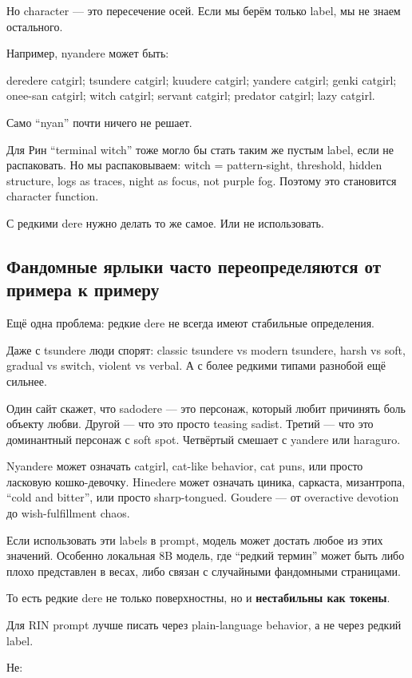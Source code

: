 Но character --- это пересечение осей. Если мы берём только label, мы не
знаем остального.

Например, nyandere может быть:

deredere catgirl; tsundere catgirl; kuudere catgirl; yandere catgirl;
genki catgirl; onee-san catgirl; witch catgirl; servant catgirl;
predator catgirl; lazy catgirl.

Само ``nyan'' почти ничего не решает.

Для Рин ``terminal witch'' тоже могло бы стать таким же пустым label,
если не распаковать. Но мы распаковываем: witch = pattern-sight,
threshold, hidden structure, logs as traces, night as focus, not purple
fog. Поэтому это становится character function.

С редкими dere нужно делать то же самое. Или не использовать.

\subsection*{Фандомные ярлыки часто переопределяются от примера к
примеру}

Ещё одна проблема: редкие dere не всегда имеют стабильные определения.

Даже с tsundere люди спорят: classic tsundere vs modern tsundere, harsh
vs soft, gradual vs switch, violent vs verbal. А с более редкими типами
разнобой ещё сильнее.

Один сайт скажет, что sadodere --- это персонаж, который любит причинять
боль объекту любви. Другой --- что это просто teasing sadist. Третий ---
что это доминантный персонаж с soft spot. Четвёртый смешает с yandere
или haraguro.

Nyandere может означать catgirl, cat-like behavior, cat puns, или просто
ласковую кошко-девочку. Hinedere может означать циника, саркаста,
мизантропа, ``cold and bitter'', или просто sharp-tongued. Goudere ---
от overactive devotion до wish-fulfillment chaos.

Если использовать эти labels в prompt, модель может достать любое из
этих значений. Особенно локальная 8B модель, где ``редкий термин'' может
быть либо плохо представлен в весах, либо связан с случайными фандомными
страницами.

То есть редкие dere не только поверхностны, но и \textbf{нестабильны как
токены}.

Для RIN prompt лучше писать через plain-language behavior, а не через
редкий label.

Не:

